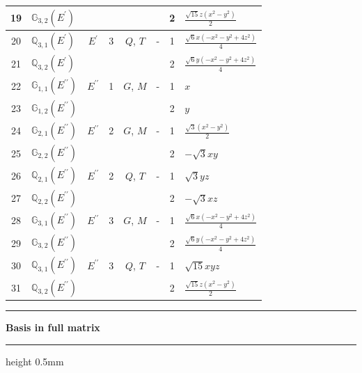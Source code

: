 \documentclass[fleqn,10pt,landscape]{jsarticle}
\begin{document}
\begin{longtable}[l]{clcccccl}
19 & $\mathbb{G}_{3,2}(E^{\prime})$ &  &  &  &  & 2 & $\frac{\sqrt{15} z \left(x^{2} - y^{2}\right)}{2}$ \\ \hline
20 & $\mathbb{Q}_{3,1}(E^{\prime})$ & $E^{\prime}$ & 3 & $Q$, $T$ & - & 1 & $\frac{\sqrt{6} x \left(- x^{2} - y^{2} + 4 z^{2}\right)}{4}$ \\
21 & $\mathbb{Q}_{3,2}(E^{\prime})$ &  &  &  &  & 2 & $\frac{\sqrt{6} y \left(- x^{2} - y^{2} + 4 z^{2}\right)}{4}$ \\ \hline
22 & $\mathbb{G}_{1,1}(E^{\prime\prime})$ & $E^{\prime\prime}$ & 1 & $G$, $M$ & - & 1 & $x$ \\
23 & $\mathbb{G}_{1,2}(E^{\prime\prime})$ &  &  &  &  & 2 & $y$ \\ \hline
24 & $\mathbb{G}_{2,1}(E^{\prime\prime})$ & $E^{\prime\prime}$ & 2 & $G$, $M$ & - & 1 & $\frac{\sqrt{3} \left(x^{2} - y^{2}\right)}{2}$ \\
25 & $\mathbb{G}_{2,2}(E^{\prime\prime})$ &  &  &  &  & 2 & $- \sqrt{3} x y$ \\ \hline
26 & $\mathbb{Q}_{2,1}(E^{\prime\prime})$ & $E^{\prime\prime}$ & 2 & $Q$, $T$ & - & 1 & $\sqrt{3} y z$ \\
27 & $\mathbb{Q}_{2,2}(E^{\prime\prime})$ &  &  &  &  & 2 & $- \sqrt{3} x z$ \\ \hline
28 & $\mathbb{G}_{3,1}(E^{\prime\prime})$ & $E^{\prime\prime}$ & 3 & $G$, $M$ & - & 1 & $\frac{\sqrt{6} x \left(- x^{2} - y^{2} + 4 z^{2}\right)}{4}$ \\
29 & $\mathbb{G}_{3,2}(E^{\prime\prime})$ &  &  &  &  & 2 & $\frac{\sqrt{6} y \left(- x^{2} - y^{2} + 4 z^{2}\right)}{4}$ \\ \hline
30 & $\mathbb{Q}_{3,1}(E^{\prime\prime})$ & $E^{\prime\prime}$ & 3 & $Q$, $T$ & - & 1 & $\sqrt{15} x y z$ \\
31 & $\mathbb{Q}_{3,2}(E^{\prime\prime})$ &  &  &  &  & 2 & $\frac{\sqrt{15} z \left(x^{2} - y^{2}\right)}{2}$ \\
\end{longtable}
\vspace{5mm}
\noindent \rule[0.5mm]{5mm}{0.5mm}\hspace{3mm}\textbf{Basis in full matrix}\hspace{3mm}\leaders\hrule height 0.5mm\hfill\kern0pt
\vspace{3mm}
\end{document}
